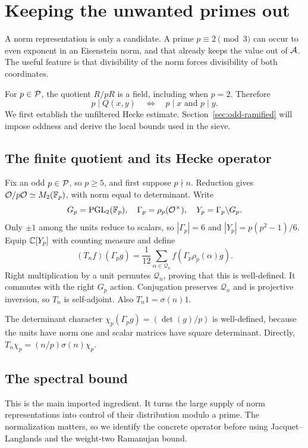 \section{Keeping the unwanted primes out}\label{sec:spectral}
A norm representation is only a candidate. A prime $p\equiv2\pmod3$
can occur to even exponent in an Eisenstein norm, and that already keeps
the value out of $\AA$. The useful feature is that divisibility of the
norm forces divisibility of both coordinates.

For $p\in\PP$, the quotient $R/pR$ is a field, including when $p=2$.
Therefore
\begin{equation}\label{eq:anisotropic}
p\mid Q(x,y)\quad\Longleftrightarrow\quad p\mid x\text{ and }p\mid y.
\end{equation}
We first establish the unfiltered Hecke estimate. Section~\ref{sec:odd-ramified}
will impose oddness and derive the local bounds used in the sieve.

\subsection{The finite quotient and its Hecke operator}
Fix an odd $p\in\PP$, so $p\ge5$, and first suppose $p\nmid n$.
Reduction gives $\OO/p\OO\simeq M_2(\F_p)$, with norm equal to determinant.
Write
\[
G_p=\PGL_2(\F_p),\quad \Gamma_p=\rho_p(\OO^\times),\quad
Y_p=\Gamma_p\backslash G_p.
\]
Only $\pm1$ among the units reduce to scalars, so
$|\Gamma_p|=6$ and $|Y_p|=p(p^2-1)/6$. Equip $\C[Y_p]$ with counting
measure and define
\begin{equation}\label{eq:hecke}
(T_nf)(\Gamma_p g)=\frac1{12}\sum_{\alpha\in\mathcal Q_n}
f(\Gamma_p\rho_p(\alpha)g).
\end{equation}
Right multiplication by a unit permutes $\mathcal Q_n$, proving that this
is well-defined. It commutes with the right $G_p$ action. Conjugation
preserves $\mathcal Q_n$ and is projective inversion, so $T_n$ is
self-adjoint. Also $T_n1=\sigma(n)1$.

The determinant character
$\chi_p(\Gamma_p g)=(\det(g)/p)$ is well-defined, because the units have
norm one and scalar matrices have square determinant. Directly,
$T_n\chi_p=(n/p)\sigma(n)\chi_p$.

\subsection{The spectral bound}
This is the main imported ingredient. It turns the large supply of norm
representations into control of their distribution modulo a prime. The
normalization matters, so we identify the concrete operator before using
Jacquet--Langlands and the weight-two Ramanujan bound.

